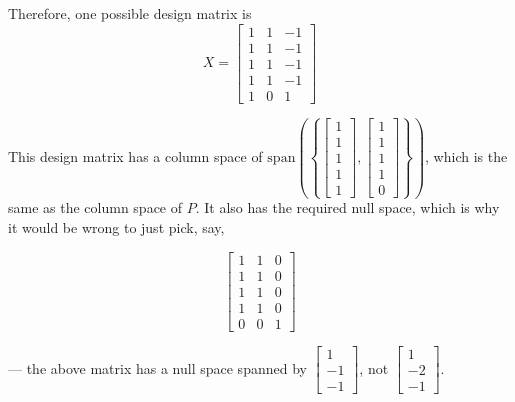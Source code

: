 \documentclass[11pt]{article}
\begin{document}
\begin{prob}[(19 pts)]
\begin{subprob}
\begin{solution}
Therefore, one possible design matrix is
\[
X =
\begin{bmatrix}
1 & 1 & -1 \\
1 & 1 & -1 \\
1 & 1 & -1 \\
1 & 1 & -1 \\
1 & 0 & 1
\end{bmatrix}
\]

This design matrix has a column space of $\text{span} \left( \left\{ \begin{bmatrix} 1 \\ 1 \\ 1 \\ 1 \\ 1 \end{bmatrix}, \begin{bmatrix} 1 \\ 1 \\ 1 \\ 1 \\ 0 \end{bmatrix}\right\} \right)$, which is the same as the column space of $P$. It also has the required null space, which is why it would be wrong to just pick, say,

$$\begin{bmatrix} 1 & 1 & 0 \\ 1 & 1 & 0 \\ 1 & 1 & 0 \\ 1 & 1 & 0 \\ 0 & 0 & 1 \end{bmatrix}$$

--- the above matrix has a null space spanned by $\begin{bmatrix} 1 \\ -1 \\ -1 \end{bmatrix}$, not $\begin{bmatrix} 1 \\ -2 \\ -1 \end{bmatrix}$.
\end{solution}
\end{subprob}

\end{prob}

\newpage
\end{document}
